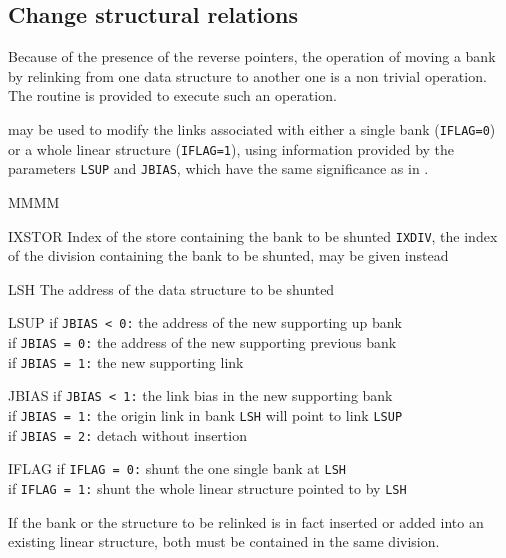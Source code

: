 \subsection{Change structural relations}
\par Because of the presence of the reverse pointers,
the operation of moving a bank by relinking from one data structure
to another one is a non trivial operation.
The routine  is provided to execute such an operation.
\par {} may be used to modify the links associated with
either a single bank ({\tt IFLAG=0})
or a whole linear structure ({\tt IFLAG=1}), using information provided
by the parameters
{\tt LSUP} and {\tt JBIAS}, which have the same significance as in
.
\Idesc
\begin{DL}{MMMM}
\item[IXSTOR]Index of the store containing the bank to be shunted
{\tt IXDIV}, the index of the division containing
the bank to be shunted, may be given instead
\item[LSH]The address of the data structure to be shunted
\item[LSUP]if {\tt JBIAS < 0:}  the address of the new supporting up bank\\
if {\tt JBIAS = 0:}  the address of the new supporting previous bank\\
if {\tt JBIAS = 1:}  the new supporting link
\item[JBIAS]if {\tt JBIAS < 1:}  the link bias in the new supporting bank\\
if {\tt JBIAS = 1:} the origin link in bank {\tt LSH}
will point to link {\tt LSUP}\\
if {\tt JBIAS = 2:}  detach without insertion
\item[IFLAG]if {\tt IFLAG = 0:}  shunt the one single bank at {\tt LSH}\\
if {\tt IFLAG = 1:}  shunt the whole linear structure pointed to by {\tt LSH}
\end{DL}
\par If the bank or the structure to be relinked is in fact inserted
or added into an existing linear structure,
both must be contained in the same division.
